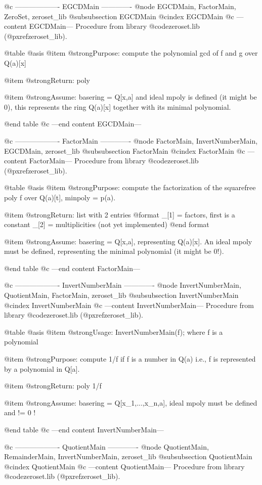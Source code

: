 @c ------------------- EGCDMain -------------
@node EGCDMain, FactorMain, ZeroSet, zeroset_lib
@subsubsection EGCDMain
@cindex EGCDMain
@c ---content EGCDMain---
Procedure from library @code{zeroset.lib} (@pxref{zeroset_lib}).

@table @asis
@item @strong{Purpose:}
compute the polynomial gcd of f and g over Q(a)[x]

@item @strong{Return:}
poly

@item @strong{Assume:}
basering = Q[x,a] and ideal mpoly is defined (it might be 0),
this represents the ring Q(a)[x] together with its minimal polynomial.

@end table
@c ---end content EGCDMain---

@c ------------------- FactorMain -------------
@node FactorMain, InvertNumberMain, EGCDMain, zeroset_lib
@subsubsection FactorMain
@cindex FactorMain
@c ---content FactorMain---
Procedure from library @code{zeroset.lib} (@pxref{zeroset_lib}).

@table @asis
@item @strong{Purpose:}
compute the factorization of the squarefree poly f over Q(a)[t],
minpoly = p(a).

@item @strong{Return:}
list with 2 entries
  @format
  _[1] = factors, first is a constant
  _[2] = multiplicities (not yet implemented)
  @end format

@item @strong{Assume:}
basering = Q[x,a], representing Q(a)[x]. An ideal mpoly must
be defined, representing the minimal polynomial (it might be 0!).

@end table
@c ---end content FactorMain---

@c ------------------- InvertNumberMain -------------
@node InvertNumberMain, QuotientMain, FactorMain, zeroset_lib
@subsubsection InvertNumberMain
@cindex InvertNumberMain
@c ---content InvertNumberMain---
Procedure from library @code{zeroset.lib} (@pxref{zeroset_lib}).

@table @asis
@item @strong{Usage:}
InvertNumberMain(f); where f is a polynomial

@item @strong{Purpose:}
compute 1/f if f is a number in Q(a) i.e., f is represented by a
polynomial in Q[a].

@item @strong{Return:}
poly 1/f

@item @strong{Assume:}
basering = Q[x_1,...,x_n,a], ideal mpoly must be defined and != 0 !

@end table
@c ---end content InvertNumberMain---

@c ------------------- QuotientMain -------------
@node QuotientMain, RemainderMain, InvertNumberMain, zeroset_lib
@subsubsection QuotientMain
@cindex QuotientMain
@c ---content QuotientMain---
Procedure from library @code{zeroset.lib} (@pxref{zeroset_lib}).

